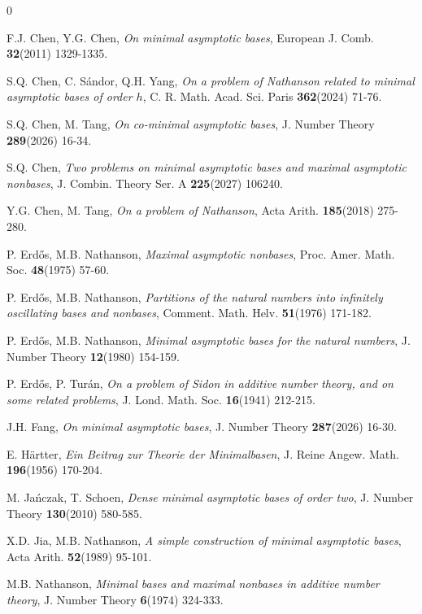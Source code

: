 \documentclass[reqno,12pt,twoside]{article}
\numberwithin{equation}{section}
\begin{document}
\begin{thebibliography}{0}

 F.J. Chen, Y.G. Chen, {\it On minimal asymptotic bases}, European J. Comb. {\bf 32}(2011) 1329-1335.

 S.Q. Chen, C. S\'andor, Q.H. Yang, {\it On a problem of Nathanson related to minimal asymptotic bases of order $h$}, C. R. Math. Acad. Sci. Paris {\bf 362}(2024) 71-76.

 S.Q. Chen, M. Tang, {\it On co-minimal asymptotic bases}, J. Number Theory {\bf 289}(2026) 16-34.

 S.Q. Chen, {\it Two problems on minimal asymptotic bases and maximal asymptotic nonbases}, J. Combin. Theory Ser. A {\bf 225}(2027) 106240.

 Y.G. Chen, M. Tang, {\it On a problem of Nathanson}, Acta Arith. {\bf 185}(2018) 275-280.

 P. Erd\H{o}s, M.B. Nathanson, {\it Maximal asymptotic nonbases}, Proc. Amer. Math. Soc. {\bf 48}(1975) 57-60.

 P. Erd\H{o}s, M.B. Nathanson, {\it Partitions of the natural numbers into infinitely oscillating bases and nonbases}, Comment. Math. Helv. {\bf 51}(1976) 171-182.

 P. Erd\H{o}s, M.B. Nathanson, {\it Minimal asymptotic bases for the natural numbers}, J. Number Theory {\bf 12}(1980) 154-159.

 P. Erd\H{o}s, P. Tur\'{a}n, {\it On a problem of Sidon in additive number theory, and on some related problems}, J. Lond. Math. Soc. {\bf 16}(1941) 212-215.

 J.H. Fang, {\it On minimal asymptotic bases}, J. Number Theory {\bf 287}(2026) 16-30.

 E. H\"artter, {\it Ein Beitrag zur Theorie der Minimalbasen}, J. Reine Angew. Math. {\bf 196}(1956) 170-204.

 M. Ja\'{n}czak, T. Schoen, {\it Dense minimal asymptotic bases of order two}, J. Number Theory {\bf 130}(2010) 580-585.

 X.D. Jia, M.B. Nathanson, {\it A simple construction of minimal asymptotic bases}, Acta Arith. {\bf 52}(1989) 95-101.

 M.B. Nathanson, {\it Minimal bases and maximal nonbases in additive number theory}, J. Number Theory {\bf 6}(1974) 324-333.


\end{thebibliography}
\end{document}
